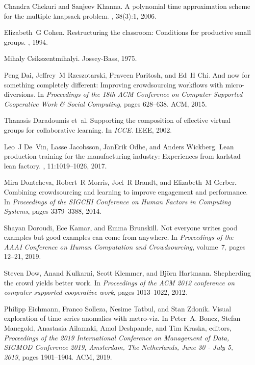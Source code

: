 \documentclass[11pt]{article}
\begin{document}
\begin{thebibliography}{10}
\begin{small}
Chandra Chekuri and Sanjeev Khanna.
\newblock A polynomial time approximation scheme for the multiple knapsack
  problem.
, 38(3):1, 2006.

Elizabeth~G Cohen.
\newblock Restructuring the classroom: Conditions for productive small groups.
, 1994.

Mihaly Csikszentmihalyi.
\newblock Jossey-Bass, 1975.

Peng Dai, Jeffrey~M Rzeszotarski, Praveen Paritosh, and Ed~H Chi.
\newblock And now for something completely different: Improving crowdsourcing
  workflows with micro-diversions.
\newblock In {\em Proceedings of the 18th ACM Conference on Computer Supported
  Cooperative Work \& Social Computing}, pages 628--638. ACM, 2015.

Thanasis Daradoumis et~al.
\newblock Supporting the composition of effective virtual groups for
  collaborative learning.
\newblock In {\em ICCE}. IEEE, 2002.

Leo~J De~Vin, Lasse Jacobsson, JanErik Odhe, and Anders Wickberg.
\newblock Lean production training for the manufacturing industry: Experiences
  from karlstad lean factory.
, 11:1019--1026, 2017.

Mira Dontcheva, Robert~R Morris, Joel~R Brandt, and Elizabeth~M Gerber.
\newblock Combining crowdsourcing and learning to improve engagement and
  performance.
\newblock In {\em Proceedings of the SIGCHI Conference on Human Factors in
  Computing Systems}, pages 3379--3388, 2014.

Shayan Doroudi, Ece Kamar, and Emma Brunskill.
\newblock Not everyone writes good examples but good examples can come from
  anywhere.
\newblock In {\em Proceedings of the AAAI Conference on Human Computation and
  Crowdsourcing}, volume~7, pages 12--21, 2019.

Steven Dow, Anand Kulkarni, Scott Klemmer, and Bj{\"o}rn Hartmann.
\newblock Shepherding the crowd yields better work.
\newblock In {\em Proceedings of the ACM 2012 conference on computer supported
  cooperative work}, pages 1013--1022, 2012.

Philipp Eichmann, Franco Solleza, Nesime Tatbul, and Stan Zdonik.
\newblock Visual exploration of time series anomalies with metro-viz.
\newblock In Peter~A. Boncz, Stefan Manegold, Anastasia Ailamaki, Amol
  Deshpande, and Tim Kraska, editors, {\em Proceedings of the 2019
  International Conference on Management of Data, {SIGMOD} Conference 2019,
  Amsterdam, The Netherlands, June 30 - July 5, 2019}, pages 1901--1904. {ACM},
  2019.


\end{small}
\end{thebibliography}
\end{document}
